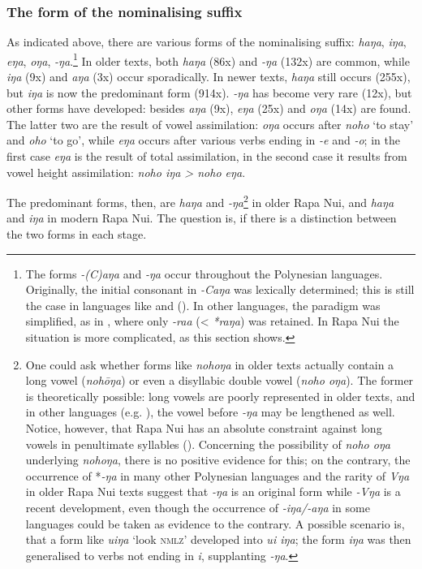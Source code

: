 \subsubsection[The form of the nominalising suffix]{The form of the nominalising suffix}\label{sec:3.2.3.2}
As indicated above, there are various forms of the nominalising suffix: \textit{haŋa}, \textit{iŋa}, \textit{eŋa}, \textit{oŋa}, \textit{-ŋa}.\footnote{\label{fn:110}The forms \textit{-(C)aŋa} and \textit{-ŋa} occur throughout the Polynesian languages. Originally, the initial consonant in \textit{-Caŋa} was lexically determined; this is still the case in languages like  \citep[512]{Bauer1993} and  (\citealt[194]{MoselHovdhaugen1992}). In other languages, the paradigm was simplified, as in , where only \textit{-ra{\ꞌ}a} ({\textless} \textit{*raŋa}) was retained. In Rapa Nui the situation is more complicated, as this section shows.} In older texts, both \textit{haŋa} (86x) and \textit{-ŋa} (132x) are common, while \textit{iŋa} (9x) and \textit{aŋa} (3x) occur sporadically. In newer texts, \textit{haŋa} still occurs (255x), but \textit{iŋa} is now the predominant form (914x). \textit{-ŋa} has become very rare (12x), but other forms have developed: besides \textit{aŋa} (9x), \textit{eŋa} (25x) and \textit{oŋa} (14x) are found. The latter two are the result of vowel assimilation: \textit{oŋa} occurs after \textit{noho} ‘to stay’ and \textit{oho} ‘to go’, while \textit{eŋa} occurs after various verbs ending in \textit{-e} and \textit{-o}; in the first case \textit{eŋa} is the result of total assimilation, in the second case it results from vowel height assimilation: \textit{noho iŋa {\textgreater} noho eŋa}. 

The predominant forms, then, are \textit{haŋa} and \textit{-ŋa}\footnote{\label{fn:111}One could ask whether forms like \textit{nohoŋa} in older texts actually contain a long vowel (\textit{nohōŋa}) or even a disyllabic double vowel (\textit{noho oŋa}). The former is theoretically possible: long vowels are poorly represented in older texts, and in other languages (e.g. ), the vowel before \textit{-ŋa} may be lengthened as well. Notice, however, that Rapa Nui has an absolute constraint against long vowels in penultimate syllables (). Concerning the possibility of \textit{noho oŋa} underlying \textit{nohoŋa}, there is no positive evidence for this; on the contrary, the occurrence of *\textit{-ŋa} in many other Polynesian languages and the rarity of \textit{Vŋa} in older Rapa Nui texts suggest that \textit{-ŋa} is an original form while \textit{-Vŋa} is a recent development, even though the occurrence of \textit{-iŋa/-aŋa} in some languages could be taken as evidence to the contrary. A possible scenario is, that a form like \textit{u{\ꞌ}iŋa} ‘look \textsc{nmlz}’ developed into \textit{u{\ꞌ}i iŋa}; the form \textit{iŋa} was then generalised to verbs not ending in \textit{i}, supplanting \textit{-ŋa}.} in older Rapa Nui, and \textit{haŋa} and \textit{iŋa} in modern Rapa Nui. The question is, if there is a distinction between the two forms in each stage.

